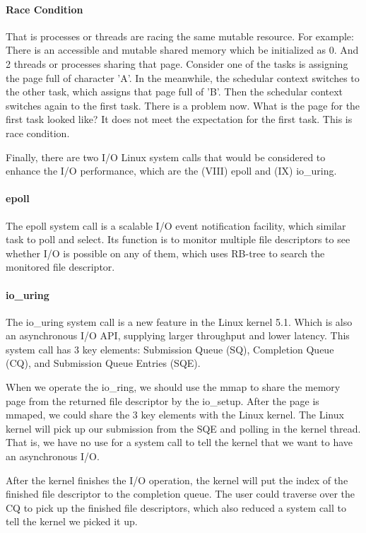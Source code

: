 \documentclass[12pt,a4paper]{article}
\begin{document}
\paragraph{Race Condition}
That is processes or threads are racing the same mutable resource. For example:
There is an accessible and mutable shared memory which be initialized as 0. And
2 threads or processes sharing that page. Consider one of the tasks is assigning
the page full of character 'A'. In the meanwhile, the schedular context switches to
the other task, which assigns that page full of 'B'. Then the schedular context switches
again to the first task. There is a problem now. What is the page for the first
task looked like? It does not meet the expectation for the first task.
This is race condition.

Finally, there are two I/O Linux system calls that would be considered to enhance
the I/O performance, which are the (\RN{8}) epoll and (\RN{9}) io\_uring.

\paragraph{epoll}
The epoll system call is a scalable I/O event notification facility, which similar
task to poll and select. Its function is to monitor multiple file descriptors to
see whether I/O is possible on any of them, which uses RB-tree to search the monitored
file descriptor.

\paragraph{io\_uring}
The io\_uring system call is a new feature in the Linux kernel 5.1. Which is also an
asynchronous I/O API, supplying larger throughput and lower latency. This system call
has 3 key elements: Submission Queue (SQ), Completion Queue (CQ), and Submission Queue
Entries (SQE).

When we operate the io\_ring, we should use the mmap to share the memory page from
the returned file descriptor by the io\_setup. After the page is mmaped, we could share
the 3 key elements with the Linux kernel. The Linux kernel will pick up our submission
from the SQE and polling in the kernel thread. That is, we have no use for a system call
to tell the kernel that we want to have an asynchronous I/O.

After the kernel finishes the I/O operation, the kernel will put the index of the finished
file descriptor to the completion queue. The user could traverse over the CQ to pick up
the finished file descriptors, which also reduced a system call to tell the kernel we picked
it up.
\end{document}
